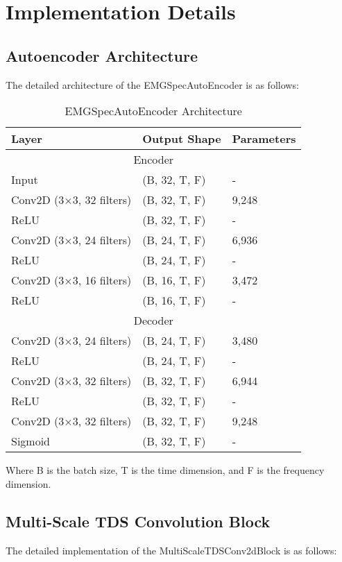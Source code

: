 \section{Implementation Details}

\subsection{Autoencoder Architecture}

The detailed architecture of the EMGSpecAutoEncoder is as follows:

\begin{table}[h]
\centering
\caption{EMGSpecAutoEncoder Architecture}
\begin{tabular}{lll}
\toprule
Layer & Output Shape & Parameters \\
\midrule
\multicolumn{3}{c}{Encoder} \\
\midrule
Input & (B, 32, T, F) & - \\
Conv2D (3×3, 32 filters) & (B, 32, T, F) & 9,248 \\
ReLU & (B, 32, T, F) & - \\
Conv2D (3×3, 24 filters) & (B, 24, T, F) & 6,936 \\
ReLU & (B, 24, T, F) & - \\
Conv2D (3×3, 16 filters) & (B, 16, T, F) & 3,472 \\
ReLU & (B, 16, T, F) & - \\
\midrule
\multicolumn{3}{c}{Decoder} \\
\midrule
Conv2D (3×3, 24 filters) & (B, 24, T, F) & 3,480 \\
ReLU & (B, 24, T, F) & - \\
Conv2D (3×3, 32 filters) & (B, 32, T, F) & 6,944 \\
ReLU & (B, 32, T, F) & - \\
Conv2D (3×3, 32 filters) & (B, 32, T, F) & 9,248 \\
Sigmoid & (B, 32, T, F) & - \\
\bottomrule
\end{tabular}
\end{table}

Where B is the batch size, T is the time dimension, and F is the frequency dimension.

\subsection{Multi-Scale TDS Convolution Block}

The detailed implementation of the MultiScaleTDSConv2dBlock is as follows:

